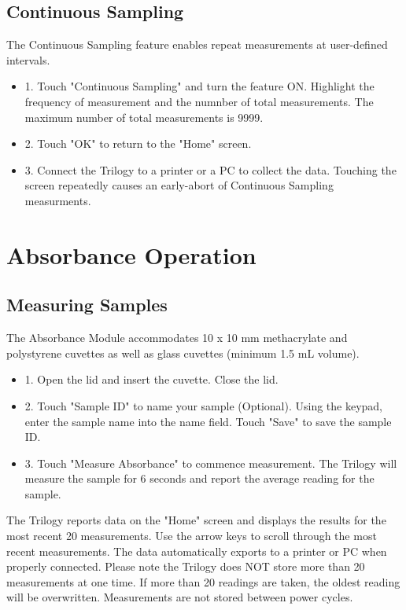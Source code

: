 \documentclass[12pt]{../SOP3_beta}
\begin{document}
\subsection{Continuous Sampling}
\NP The Continuous Sampling feature enables repeat measurements at user-defined intervals.
\begin{itemize}
  \item 1. Touch "Continuous Sampling" and turn the feature ON. Highlight the frequency of measurement and the numnber of total measurements. The maximum number of total measurements is 9999.
  \item 2. Touch "OK" to return to the "Home" screen.
  \item 3. Connect the Trilogy to a printer or a PC to collect the data. Touching the screen repeatedly causes an early-abort of Continuous Sampling measurments. 
\end{itemize}

\section{Absorbance Operation}
\subsection{Measuring Samples}
\NP The Absorbance Module accommodates 10 x 10 mm methacrylate and polystyrene cuvettes as well as glass cuvettes (minimum 1.5 mL volume).
\begin{itemize}
  \item 1. Open the lid and insert the cuvette. Close the lid.
  \item 2. Touch "Sample ID" to name your sample (Optional). Using the keypad, enter the sample name into the name field. Touch "Save" to save the sample ID. 
  \item 3. Touch "Measure Absorbance" to commence measurement. The Trilogy will measure the sample for 6 seconds and report the average reading for the sample. 
\end{itemize}

\NP The Trilogy reports data on the "Home" screen and displays the results for the most recent 20 measurements. Use the arrow keys to scroll through the most recent measurements. The data automatically exports to a printer or PC when properly connected. Please note the Trilogy does NOT store more than 20 measurements at one time. If more than 20 readings are taken, the oldest reading will be overwritten. Measurements are not stored between power cycles.
\end{document}
